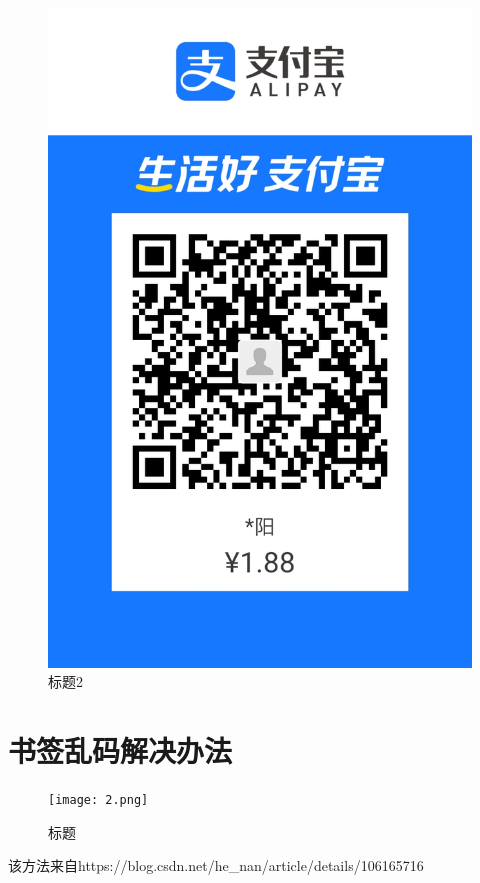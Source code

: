 \documentclass{article}
\begin{document}
\begin{figure}[hbt]
\begin{minipage}[t]{0.5\textwidth}
		\includegraphics[scale=0.2]{1.jpg}
		\caption{标题2}
	\end{minipage}
\end{figure}
\newpage
\section{书签乱码解决办法}
\begin{figure}[hbt]%
  \centering
  \texttt{[image: 2.png]}%
  \caption{标题}
\end{figure} 
该方法来自https://blog.csdn.net/he\_nan/article/details/106165716
\newpage
\end{document}
